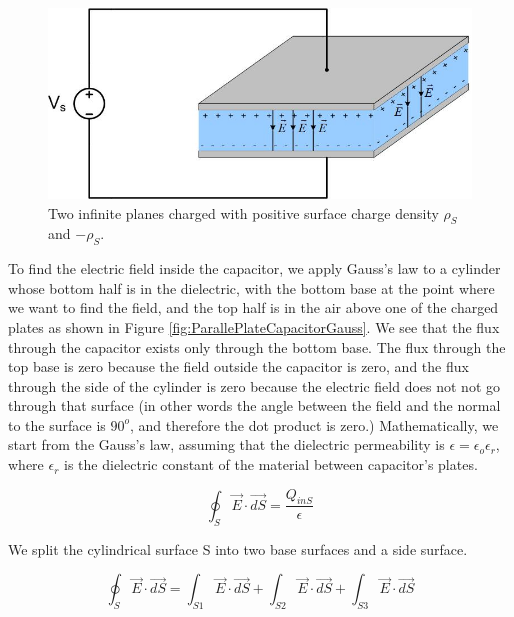 \documentclass{ximera}
\begin{document}
\begin{figure}[htbp]
\begin{center}
\includegraphics[scale=0.6]{../jpg/Parallel_Plate_Capacitor.jpg}
\end{center}
\caption{Two infinite planes charged with positive surface charge density $\rho_S$ and $-\rho_S.$}
\label{fig:ParallePlateCapacitorCircuit}
\end{figure}


To find the electric field inside the capacitor, we apply Gauss's law to a cylinder whose bottom half is in the dielectric, with the bottom base at the point where we want to find the field, and the top half is in the air above one of the charged plates as shown in Figure \ref{fig:ParallePlateCapacitorGauss}. We see that the flux through the capacitor exists only through the bottom base. The flux through the top base is zero because the field outside the capacitor is zero, and the flux through the side of the cylinder is zero because the electric field does not not go through that surface (in other words the angle between the field and the normal to the surface is $90^o$, and therefore the dot product is zero.) Mathematically, we start from the Gauss's law, assuming that the dielectric permeability is $\epsilon=\epsilon_o \epsilon_r$, where $\epsilon_r$ is the dielectric constant of the material between capacitor's plates.

\begin{equation}
\oint_S \vec{E} \cdot \vec{dS} = \frac{Q_{inS}}{\epsilon}
\end{equation}
 
We split the cylindrical surface S into two base surfaces and a side surface.
 
\begin{equation}
\oint_S \vec{E} \cdot \vec{dS} = \int_{S1}  \vec{E} \cdot \vec{dS} +\int_{S2}  \vec{E} \cdot \vec{dS}+\int_{S3}  \vec{E} \cdot \vec{dS} 
\end{equation}
\end{document}
